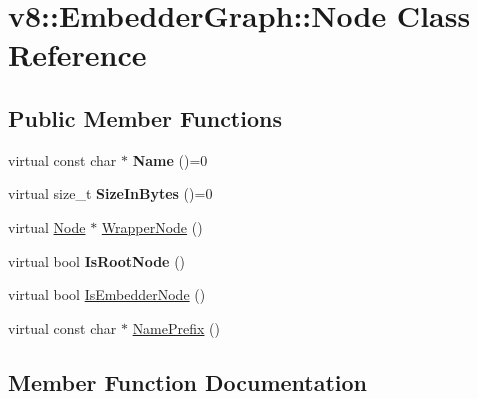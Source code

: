 \hypertarget{classv8_1_1EmbedderGraph_1_1Node}{}\section{v8\+:\+:Embedder\+Graph\+:\+:Node Class Reference}
\label{classv8_1_1EmbedderGraph_1_1Node}
\subsection*{Public Member Functions}
\begin{DoxyCompactItemize}
\item 
\mbox{\label{classv8_1_1EmbedderGraph_1_1Node_af07ffa90f03e52bf53e58ab512c2e1fe}} 
virtual const char $\ast$ {\bfseries Name} ()=0
\item 
\mbox{\label{classv8_1_1EmbedderGraph_1_1Node_a47fa609f09f06eb6f9dac80e46fcbe10}} 
virtual size\+\_\+t {\bfseries Size\+In\+Bytes} ()=0
\item 
virtual \mbox{\hyperlink{classv8_1_1EmbedderGraph_1_1Node}{Node}} $\ast$ \mbox{\hyperlink{classv8_1_1EmbedderGraph_1_1Node_acfe58e3b4db90c2ebbfcee5f81415181}{Wrapper\+Node}} ()
\item 
\mbox{\label{classv8_1_1EmbedderGraph_1_1Node_ad1ebb9298b7fcac73c55e693e028a501}} 
virtual bool {\bfseries Is\+Root\+Node} ()
\item 
virtual bool \mbox{\hyperlink{classv8_1_1EmbedderGraph_1_1Node_a62a22058ec311d7e9b6ac8ec061967af}{Is\+Embedder\+Node}} ()
\item 
virtual const char $\ast$ \mbox{\hyperlink{classv8_1_1EmbedderGraph_1_1Node_a2c4c64b2c3eab48dcdc587aec8734ee8}{Name\+Prefix}} ()
\end{DoxyCompactItemize}


\subsection{Member Function Documentation}
\mbox{\label{classv8_1_1EmbedderGraph_1_1Node_a62a22058ec311d7e9b6ac8ec061967af}} 
